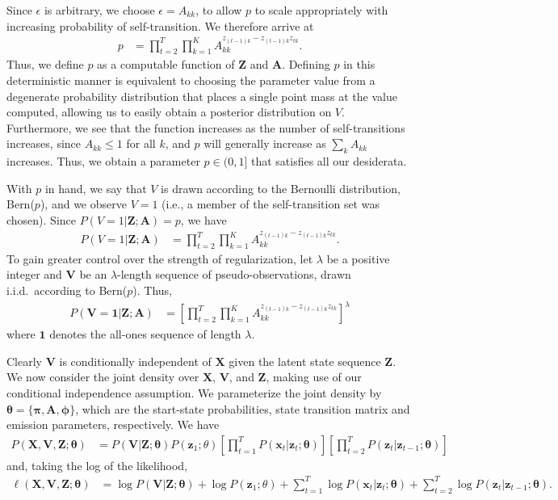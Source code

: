 Since $\epsilon$ is arbitrary, we choose $\epsilon = A_{kk}$, to allow $p$ to scale appropriately with increasing probability of self-transition. We therefore arrive at
\begin{align*}
    p &= \prod^{T}_{t=2}\prod^{K}_{k=1}A_{kk}^{z_{(t-1)k} - z_{(t-1)k}z_{tk}}.
\end{align*}
Thus, we define $p$ as a computable function of $\mathbf{Z}$ and $\mathbf{A}$. Defining $p$ in this deterministic manner is equivalent to choosing the parameter value from a degenerate probability distribution that places a single point mass at the value computed, allowing us to easily obtain a posterior distribution on $V$. Furthermore, we see that the function increases as the number of self-transitions increases, since $A_{kk} \leq 1$ for all $k$, and $p$ will generally increase as $\sum_k A_{kk}$ increases. Thus, we obtain a parameter $p \in (0,1]$ that satisfies all our desiderata.

With $p$ in hand, we say that $V$ is drawn according to the Bernoulli distribution, Bern($p$), and we observe $V = 1$ (i.e., a member of the self-transition set was chosen). Since $P(V = 1|\mathbf{Z};\mathbf{A}) = p$, we have
\begin{align*}
    P(V = 1|\mathbf{Z}; \mathbf{A}) &= \prod^{T}_{t=2}\prod^{K}_{k=1}A_{kk}^{z_{(t-1)k} - z_{(t-1)k}z_{tk}}.
\end{align*}
To gain greater control over the strength of regularization, let $\lambda$ be a positive integer and $\mathbf{V}$ be an $\lambda$-length sequence of pseudo-observations, drawn i.i.d.\ according to Bern($p$). Thus, 
\begin{align*}
    P(\mathbf{V} = \mathbf{1}|\mathbf{Z}; \mathbf{A}) &= \left[\prod^{T}_{t=2}\prod^{K}_{k=1}A_{kk}^{z_{(t-1)k} - z_{(t-1)k}z_{tk}}\right]^\lambda
\end{align*}
where $\mathbf{1}$ denotes the all-ones sequence of length $\lambda$.

Clearly $\mathbf{V}$ is conditionally independent of $\mathbf{X}$ given the latent state sequence $\mathbf{Z}$. We now consider the joint density over $\mathbf{X}$, $\mathbf{V}$, and $\mathbf{Z}$, making use of our conditional independence assumption. We parameterize the joint density by $\mathbf{\theta} = \{\mathbf{\pi},\mathbf{A}, \mathbf{\phi}\}$, which are the start-state probabilities, state transition matrix and emission parameters, respectively. We have
\begin{align*}
    P(\mathbf{X}, \mathbf{V}, \mathbf{Z} ; \mathbf{\theta}) 
    &= P(\mathbf{V}|\mathbf{Z}; \mathbf{\theta}) P(\mathbf{z}_{1} ; \theta) \left[\prod_{t=1}^{T}P(\mathbf{x}_t|\mathbf{z}_t; \mathbf{\theta})\right]\left[\prod_{t=2}^{T}P(\mathbf{z}_t|\mathbf{z}_{t-1}; \mathbf{\theta})\right]
\end{align*}
and, taking the log of the likelihood,
\begin{align*}
    \ell(\mathbf{X}, \mathbf{V}, \mathbf{Z} ; \mathbf{\theta}) 
    &= \log P(\mathbf{V}|\mathbf{Z}; \mathbf{\theta}) + \log P(\mathbf{z}_{1}; \theta) + \sum_{t=1}^{T}\log P(\mathbf{x}_t|\mathbf{z}_t; \mathbf{\theta}) + \sum_{t=2}^{T}\log P(\mathbf{z}_t|\mathbf{z}_{t-1};\mathbf{\theta}).
\end{align*}

